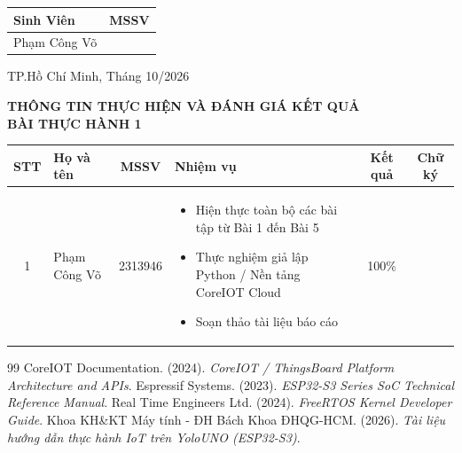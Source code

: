 \documentclass[a4paper]{article}
\begin{document}
\begin{titlepage}
\begin{center}
{\fontsize{13}{14}\selectfont
\begin{tabular}{|>{\centering\arraybackslash}p{7cm}|>{\centering\arraybackslash}p{4cm}|}
\hline
\textbf{Sinh Viên} & \textbf{MSSV} \\
\hline

Phạm Công Võ & 2313946 \\
\hline

\end{tabular}
}
\end{center}


\vspace{1.8cm}
\begin{center}
{\large TP.Hồ Chí Minh, Tháng 10/2026}
\end{center}
\end{titlepage}
\restoregeometry
\restoregeometry

\newpage
\begin{center}
    \textbf{\Large THÔNG TIN THỰC HIỆN VÀ ĐÁNH GIÁ KẾT QUẢ}\\[1ex]
    \textbf{\large BÀI THỰC HÀNH 1}
\end{center}

\vspace{1.5em}

\begin{longtable}{|c|m{4cm}|c|m{4.5cm}|c|c|}
\hline
\textbf{STT} & \textbf{\centering Họ và tên} & \textbf{MSSV} & \textbf{\centering Nhiệm vụ} & \textbf{Kết quả} & \textbf{Chữ ký} \\
\hline
1 & Phạm Công Võ & 2313946 & \begin{itemize}[leftmargin=*]
    \item Hiện thực toàn bộ các bài tập từ Bài 1 đến Bài 5
    \item Thực nghiệm giả lập Python / Nền tảng CoreIOT Cloud
    \item Soạn thảo tài liệu báo cáo
\end{itemize} & 100\% & \\
\hline
\end{longtable}

\newpage
\tableofcontents
\newpage



\newpage
{}
\begin{thebibliography}{99}
CoreIOT Documentation. (2024). \textit{CoreIOT / ThingsBoard Platform Architecture and APIs}.
Espressif Systems. (2023). \textit{ESP32-S3 Series SoC Technical Reference Manual}.
Real Time Engineers Ltd. (2024). \textit{FreeRTOS Kernel Developer Guide}.
Khoa KH\&KT Máy tính - ĐH Bách Khoa ĐHQG-HCM. (2026). \textit{Tài liệu hướng dẫn thực hành IoT trên YoloUNO (ESP32-S3)}.
\end{thebibliography}
\end{document}

